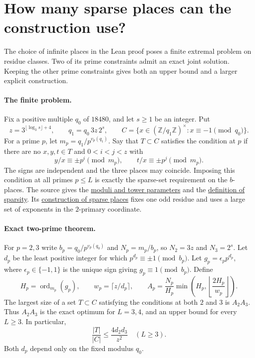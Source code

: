 \section{How many sparse places can the construction use?}
\label{sec:spcap}

The choice of infinite places in the Lean proof poses a finite extremal
problem on residue classes. Two of its prime constraints admit an exact
joint solution. Keeping the other prime constraints gives both an upper
bound and a larger explicit construction.

\paragraph{The finite problem.}
Fix a positive multiple $q_0$ of $18480$, and let $s\ge1$ be an integer.
Put
\[
 z=3^{\lfloor\log_3s\rfloor+4},\qquad q_1=q_0\,3z\,2^s,\qquad
 C=\{x\in(\mathbb Z/q_1\mathbb Z)^\times:x\equiv-1\pmod{q_0}\}.
\]
For a prime $p$, let $m_p=q_1/p^{v_p(q_1)}$. Say that $T\subset C$
satisfies the condition at $p$ if there are no $x,y,t\in T$ and
$0<i<j<z$ with
\[
  y/x\equiv\pm p^i\pmod {m_p},\qquad
  t/x\equiv\pm p^j\pmod {m_p}.
\]
The signs are independent and the three places may coincide. Imposing
this condition at all primes $p\le L$ is exactly the sparse-set requirement
on the $b$-places. The source gives the
\href{https://github.com/lsernau/grh-lean/blob/72fead102f663d5c7a407964a13dc0cf9d977207/grh/src/New/Reduction/Data/FieldsAndPlaces.lean\#L65-L110}{moduli and tower parameters}
and the
\href{https://github.com/lsernau/grh-lean/blob/72fead102f663d5c7a407964a13dc0cf9d977207/grh/src/New/Reduction/Data/AdmissibleData.lean\#L54-L62}{definition of sparsity}.
Its
\href{https://github.com/lsernau/grh-lean/blob/72fead102f663d5c7a407964a13dc0cf9d977207/grh/src/New/Reduction/Data/Existence.lean\#L164-L238}{construction of sparse places}
fixes one odd residue and uses a large set of exponents in the $2$-primary
coordinate.

\paragraph{Exact two-prime theorem.}
For $p=2,3$ write $b_p=q_0/p^{v_p(q_0)}$ and $N_p=m_p/b_p$, so
$N_2=3z$ and $N_3=2^s$. Let $d_p$ be the least positive integer for
which $p^{d_p}\equiv\pm1\pmod{b_p}$. Let $g_p=\epsilon_p p^{d_p}$,
where $\epsilon_p\in\{-1,1\}$ is the unique sign giving
$g_p\equiv1\pmod{b_p}$. Define
\[
 H_p=\operatorname{ord}_{m_p}(g_p),\qquad
 w_p=\lceil z/d_p\rceil,\qquad
 A_p=\frac{N_p}{H_p}\min\left(H_p,
           \left\lfloor\frac{2H_p}{w_p}\right\rfloor\right).
\]
The largest size of a set $T\subset C$ satisfying the conditions at both
$2$ and $3$ is $A_2A_3$. Thus $A_2A_3$ is the exact optimum for $L=3,4$,
and an upper bound for every $L\ge3$. In particular,
\[
    \frac{|T|}{|C|}\le \frac{4d_2d_3}{z^2}\quad (L\ge3).
\]
Both $d_p$ depend only on the fixed modulus $q_0$.

